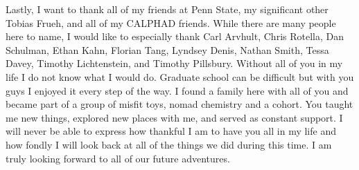 Lastly, I want to thank all of my friends at Penn State, my significant other Tobias Frueh, and all of my CALPHAD friends. While there are many people here to name, I would like to especially thank Carl Arvhult, Chris Rotella, Dan Schulman, Ethan Kahn, Florian Tang, Lyndsey Denis, Nathan Smith, Tessa Davey, Timothy Lichtenstein, and Timothy Pillsbury. Without all of you in my life I do not know what I would do. Graduate school can be difficult but with you guys I enjoyed it every step of the way. I found a family here with all of you and became part of a group of misfit toys, nomad chemistry and a cohort. You taught me new things, explored new places with me, and served as constant support. I will never be able to express how thankful I am to have you all in my life and how fondly I will look back at all of the things we did during this time. I am truly looking forward to all of our future adventures.
